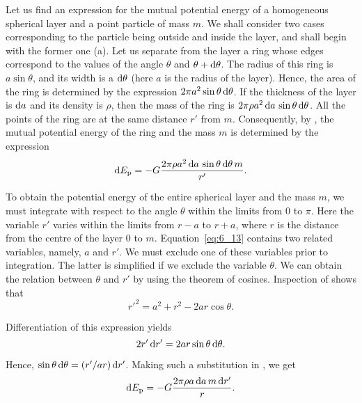 Let us find an expression for the mutual potential energy of a homogeneous spherical layer and a point particle of mass $m$. We shall consider two cases corresponding to the particle being outside and inside the layer, and shall begin with the former one (a). Let us separate from the layer a ring whose edges correspond to the values of the angle $\theta$ and $\theta+\mathrm{d}\theta$. The radius of this ring is $a\sin\theta$, and its width is a $\mathrm{d}\theta$ (here $a$ is the radius of the layer). Hence, the area of the ring is determined by the expression $2\pi a^2\sin\theta\,\mathrm{d}\theta$. If the thickness of the layer is $\mathrm{d} a$ and its density is $\rho$, then the mass of the ring is $2\pi\rho a^2\,\mathrm{d} a\,\sin\theta\,\mathrm{d}\theta$. All the points of the ring are at the same distance $r'$ from $m$. Consequently, by , the mutual potential energy of the ring and the mass $m$ is determined by the expression
\begin{equation}\label{eq:6_13}
	\mathrm{d} E_{\text{p}} = -G\frac{2\pi\rho a^2\,\mathrm{d} a\,\sin\theta\,\mathrm{d}\theta\,m}{r'}.
\end{equation}

To obtain the potential energy of the entire spherical layer and the mass $m$, we must integrate  with respect to the angle $\theta$ within the limits from $0$ to $\pi$. Here the variable $r'$ varies within the limits from $r-a$ to $r+a$, where $r$ is the distance from the centre of the layer $0$ to $m$. Equation~\eqref{eq:6_13} contains two related variables, namely, $a$ and $r'$. We must exclude one of these variables prior to integration. The latter is simplified if we exclude the variable $\theta$. We can obtain the relation between $\theta$ and $r'$ by using the theorem of cosines. Inspection of  shows that
\begin{equation*}
	r'^2 = a^2 + r^2 - 2ar\cos\theta.
\end{equation*}

\noindent
Differentiation of this expression yields
\begin{equation*}
	2r'\,\mathrm{d} r' = 2ar\sin\theta\,\mathrm{d}\theta.
\end{equation*}

\noindent
Hence, $\sin\theta\,\mathrm{d}\theta=(r'/ar)\,\mathrm{d} r'$. Making such a substitution in , we get
\begin{equation*}
	\mathrm{d} E_{\text{p}} = -G\frac{2\pi\rho a\,\mathrm{d} a\,m\,\mathrm{d} r'}{r}.
\end{equation*}

